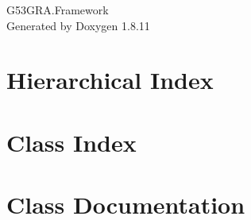 \documentclass[twoside]{book}
\newcommand{\+}{\discretionary{\mbox{\scriptsize$\hookleftarrow$}}{}{}}
\newcommand{\clearemptydoublepage}{%
  \newpage{\pagestyle{empty}\cleardoublepage}%
}
\begin{document}
\hypersetup{pageanchor=false,
             bookmarksnumbered=true,
             pdfencoding=unicode
            }
\begin{titlepage}
\vspace*{7cm}
\begin{center}%
{\Large G53\+G\+R\+A.\+Framework }\\
\vspace*{1cm}
{\large Generated by Doxygen 1.8.11}\\
\end{center}
\end{titlepage}
\clearemptydoublepage
\tableofcontents
\clearemptydoublepage
{}
\hypersetup{pageanchor=true}

\chapter{Hierarchical Index}

\chapter{Class Index}

\chapter{Class Documentation}











\backmatter
\newpage
{}
\clearemptydoublepage
{}
\printindex
\end{document}

